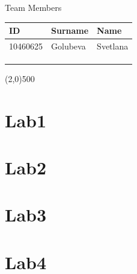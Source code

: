 \documentclass[a4paper,12pt,titlepage]{article} %
\begin{document}
\begin{titlepage}
\vspace{20pt}

\begin{center}
	{\large Team Members}
\end{center}
\begin{tabularx}{\textwidth}{|X|X|X|}
	\hline
	ID & Surname & Name\\
	\hline
	10460625 & Golubeva & Svetlana\\
	\hline
	 &  & \\
	\hline
	 &  & \\
	\hline
	 &  & \\
	\hline
\end{tabularx}

\vspace{\fill}
\begin{center}
	\line(2,0){500}
\end{center}

\end{titlepage}

\tableofcontents

\newpage
\listoftables

\listoffigures

\newpage
\section{Lab1}

\newpage
\section{Lab2}

\newpage
\section{Lab3}

\newpage
\section{Lab4}

\newpage
\end{document}
